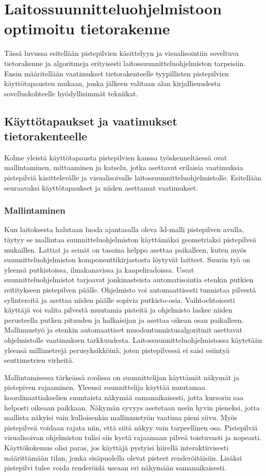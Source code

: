 \section{Laitossuunnitteluohjelmistoon optimoitu tietorakenne} \label{mun}

Tässä luvussa esitellään pistepilvien käsittelyyn ja visualisointiin soveltuva tietorakenne ja algoritmeja erityisesti laitossuunnitteluohjelmiston tarpeisiin. Ensin määritellään vaatimukset tietorakenteelle tyypillisten pistepilvien käyttötapausten mukaan, jonka jälkeen valitaan alan kirjallisuudesta sovelluskohteelle hyödyllisimmät tekniikat.

\subsection{Käyttötapaukset ja vaatimukset tietorakenteelle}\label{usecase}

Kolme yleistä käyttötapausta pistepilvien kanssa työskenneltäessä ovat mallintaminen, mittaaminen ja katselu, jotka asettavat erilaisia vaatimuksia pistepilviä käsittelevälle ja visualisoivalle laitossuunnitteluohjelmistolle. Esitellään seuraavaksi käyttötapaukset ja niiden asettamat vaatimukset. 

\subsubsection{Mallintaminen}
 Kun laitoksesta halutaan luoda ajantasalla oleva 3d-malli pistepilven avulla, täytyy se mallintaa suunnitteluohjelmiston käyttämäksi geometriaksi pistepilveä mukaillen. Lattiat ja seinät on tasoina helppo asettaa paikalleen, kuten myös suunnitteluohjelmiston komponenttikirjastosta löytyvät laitteet. Suurin työ on yleensä putkistoissa, ilmakanavissa ja kaapeliradoissa. Useat suunnitteluohjelmistot tarjoavat jonkinasteista automatisointia etenkin putkien reititykseen pistepilven päälle. Ohjelmisto voi automaattisesti tunnistaa pilvestä sylintereitä ja asettaa niiden päälle sopivia putkisto-osia. Vaihtoehtoisesti käyttäjä voi valita pilvestä muutamia pisteitä ja ohjelmisto laskee niiden perusteella putken pituuden ja halkaisijan ja asettaa oikean osan paikalleen. Mallinnustyö ja etenkin automaattiset muodontunnistusalgoritmit asettavat ohjelmistolle vaatimuksen tarkkuudesta. Laitossuunnitteluohjelmistossa käytetään yleensä millimetrejä perusyksikköinä, joten pistepilvessä ei saisi esiintyä senttimetrien virheitä.

Mallintamisessa tärkeässä roolissa on suunnittelijan käyttämät näkymät ja pistepiven rajaaminen. Yleensä suunnittelija käyttää muutamaa koordinaattiakselien suuntaista näkymää samanaikaisesti, jotta kursorin saa helposti oikeaan paikkaan. Näkymän syvyys asetetaan usein hyvin pieneksi, jotta mallista näkyisi vain kulloisenkin mallinnustyön vaatima pieni siivu. Myös pistepilveä voidaan rajata niin, että siitä näkyy vain tarpeellinen osa. Pistepilviä visualisoivan ohjelmiston tulisi siis kyetä rajaamaan pilveä toistuvasti ja nopeasti. Käyttökokemus olisi paras, jos käyttäjä pystyisi hiirellä interaktiivisesti määrittämään tilan, jonka sisäpuolella olevat pisteet renderöitäisiin. Lisäksi pistepilvi tulee voida renderöidä useaan eri näkymään samanaikaisesti.

